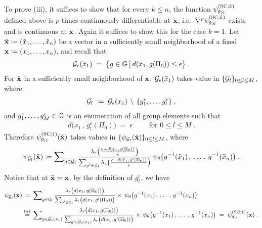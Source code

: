 \vspace{.5em}

To prove (iii), it suffices to show that for every $k \leq n$, the function $\psi^{({\rm SC};k)}_{\theta;\epsilon}$ defined above is $p$-times continuously differentiable at $\mathbf{x}$, i.e.~$\nabla^p \psi^{({\rm SC};k)}_{\theta;\epsilon}$ exists and is continuous at $\mathbf{x}$. Again it suffices to show this for the case $k=1$. Let $\tilde {\mathbf{x}} \coloneqq (\tilde x_1, \ldots, \tilde x_n)$ be a vector in a sufficiently small neighborhood of a fixed $\mathbf{x} \coloneqq (x_1, \ldots, x_n)$, and recall that 
\begin{align*}
    \mathcal{G}_\epsilon( \tilde x_1 )
    \;=\; 
    \big\{ g \in \mathbb{G} \,\big|\, d( \tilde x_1, g(\Pi_0)) \leq \epsilon \big\}
    \;.
\end{align*}
For $\tilde {\mathbf{x}}$ in a sufficiently small neighborhood of $\mathbf{x}$, $\mathcal{G}_\epsilon( \tilde x_1 )$ takes value in $\{ \mathcal{G}_l \}_{0 \leq l \leq M}$, where 
\begin{align*}
    \mathcal{G}_l
    \;\coloneqq\;
    \mathcal{G}_\epsilon(x_1)
    \,\setminus\, 
    \{ g^\epsilon_1, \ldots, g^\epsilon_l \} 
    \;,
\end{align*}
and $g^\epsilon_1, \ldots, g^\epsilon_M \in \mathbb{G}$ is an enumeration of all group elements such that 
\begin{align*}
    d\big( x_1 \,,\, g^\epsilon_l(\Pi_0) \big)
    \;=\; 
    \epsilon
    \qquad 
    \text{ for } 0 \leq l \leq M\;.
\end{align*}
Therefore $\psi^{({\rm SC};1)}_{\theta;\epsilon}(\tilde {\mathbf{x}})$ takes values in $\{\psi_{\mathcal{G}_l}(\tilde {\mathbf{x}}) \}_{0 \leq l \leq M}$, where 
\begin{align*}
    \psi_{\cG_l}(\tilde \bx)
    \coloneqq
    \msum_{g \in \cG_l} 
    \mfrac{ \lambda_\epsilon\big( \frac{\epsilon - d(  \tilde x_1, g(\Pi_0))}{\epsilon} \big) }{\sum_{g' \in \cG_l} \lambda_\epsilon\big( \frac{\epsilon - d(\tilde x_1, g'(\Pi_0))}{\epsilon} \big)  }
    \, \psi_\theta\big(
        g^{-1}  (\tilde x_1)
        \,,\,
        \ldots 
        \,,\,
        g^{-1} (\tilde x_n)
    \big) 
    \;.
\end{align*}
Notice that at $\tilde {\mathbf{x}}=\mathbf{x}$, by the definition of $g^\epsilon_l$, we have
\begin{align*}
    \psi_{\cG_l}(\bx)
    \;=&\;
    \msum_{g \in \cG_l} 
    \mfrac{ \lambda_\epsilon \big( d(  x_1, g(\Pi_0)) \big) }{\sum_{g' \in \cG_l}  \lambda_\epsilon \big( d(  x_1, g'(\Pi_0)) \big)  }
    \times
    \, \psi_\theta\big(
        g^{-1}  ( x_1)
        \,,\,
        \ldots 
        \,,\,
        g^{-1}  ( x_n)
    \big) 
    \\ 
    \;\overset{(a)}{=}&\;
    \msum_{g \in \cG_\epsilon(x_1)} 
    \mfrac{ \lambda_\epsilon \big(  d(   x_1, g(\Pi_0))  \big) }{\sum_{g' \in \cG_\epsilon(x_1)} \lambda_\epsilon\big( d( x_1, g'(\Pi_0)) \big)  }
    \times
    \, \psi_\theta\big(
        g^{-1} ( x_1)
        \,,\,
        \ldots 
        \,,\,
        g^{-1}  ( x_n)
    \big) 
    \;=\; \psiSCone_{\theta;\epsilon}(\bx)
    \;.
\end{align*}
